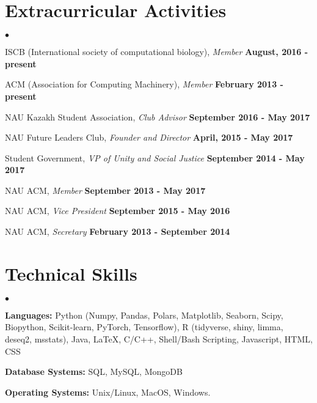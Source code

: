 \documentclass[margin,line]{res}
\newenvironment{list2}{
  \begin{list}{$\bullet$}{%
      \setlength{\itemsep}{0in}
      \setlength{\parsep}{0in} \setlength{\parskip}{0in}
      \setlength{\topsep}{0in} \setlength{\partopsep}{0in}
      \setlength{\leftmargin}{0.2in}}}{\end{list}}
\begin{document}
\begin{resume}
\section{\sc Extracurricular Activities}
\begin{list2}
\item ISCB (International society of computational biology), {\em Member} \hfill {\bf August, 2016 - present}
\item ACM (Association for Computing Machinery), {\em Member} \hfill  {\bf February 2013 - present}
\item NAU Kazakh Student Association, {\em Club Advisor} \hfill {\bf September 2016 - May 2017}
\item NAU Future Leaders Club, {\em Founder and Director} \hfill {\bf April, 2015 - May 2017}
\item Student Government, {\em VP of Unity and Social Justice} \hfill  {\bf September 2014 - May 2017}
\item NAU ACM, {\em Member} \hfill {\bf September 2013 - May 2017}
\item NAU ACM, {\em Vice President} \hfill  {\bf September 2015 - May 2016}
\item NAU ACM, {\em Secretary} \hfill  {\bf February 2013 - September 2014}
\end{list2}

\section{\sc Technical Skills}
\begin{list2}
\item {\bf Languages:}  Python (Numpy, Pandas, Polars, Matplotlib, Seaborn, Scipy, Biopython, Scikit-learn, PyTorch, Tensorflow), R (tidyverse, shiny, limma, deseq2, msstats), Java, \LaTeX, C/C++, Shell/Bash Scripting, Javascript, HTML, CSS
\item {\bf Database Systems:} SQL, MySQL, MongoDB
\item {\bf Operating Systems:}  Unix/Linux, MacOS, Windows.
\end{list2}


\end{resume}
\end{document}
